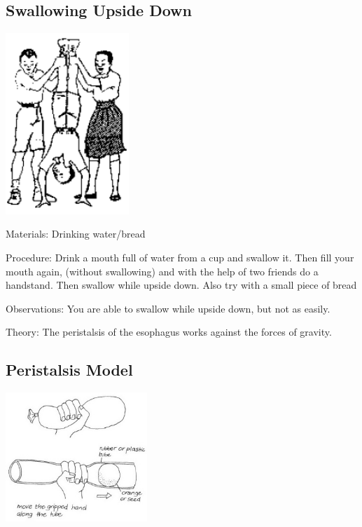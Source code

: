 \begin{multicols}{2}
\subsection{Swallowing Upside Down} %

\begin{center}
\includegraphics[width=0.35\textwidth]{./img/source/peristalsis.png}
\end{center}

\begin{description*}
\item[Materials:]{Drinking water/bread}
\item[Procedure:]{Drink a mouth full of water from a cup and swallow it. Then fill your mouth again, (without
swallowing) and with the help of two friends do a handstand. Then swallow while upside down. Also try with a small piece of bread}
\item[Observations:]{You are able to swallow while upside down, but not as easily.}
\item[Theory:]{The peristalsis of the
esophagus works against the forces of gravity.}
\end{description*}

\subsection{Peristalsis Model} %

\begin{center}
\includegraphics[width=0.4\textwidth]{./img/vso/peristalsis-model.jpg}
\end{center}


\end{multicols}
